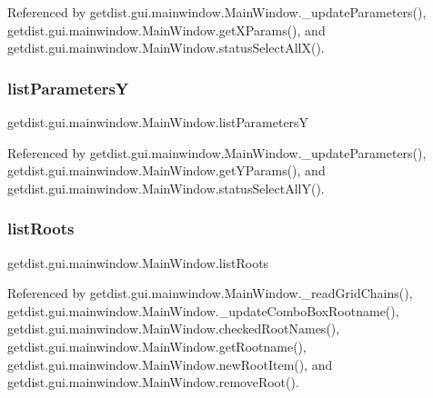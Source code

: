 Referenced by getdist.\+gui.\+mainwindow.\+Main\+Window.\+\_\+update\+Parameters(), getdist.\+gui.\+mainwindow.\+Main\+Window.\+get\+X\+Params(), and getdist.\+gui.\+mainwindow.\+Main\+Window.\+status\+Select\+All\+X().

\mbox{\label{classgetdist_1_1gui_1_1mainwindow_1_1MainWindow_acff0069bba3eaa164fc526de79bfe3a5}} 
\subsubsection{\texorpdfstring{list\+ParametersY}{listParametersY}}
{\footnotesize\ttfamily getdist.\+gui.\+mainwindow.\+Main\+Window.\+list\+ParametersY}



Referenced by getdist.\+gui.\+mainwindow.\+Main\+Window.\+\_\+update\+Parameters(), getdist.\+gui.\+mainwindow.\+Main\+Window.\+get\+Y\+Params(), and getdist.\+gui.\+mainwindow.\+Main\+Window.\+status\+Select\+All\+Y().

\mbox{\label{classgetdist_1_1gui_1_1mainwindow_1_1MainWindow_a18fc4f8efb9fb444611944dd75e5847e}} 
\subsubsection{\texorpdfstring{list\+Roots}{listRoots}}
{\footnotesize\ttfamily getdist.\+gui.\+mainwindow.\+Main\+Window.\+list\+Roots}



Referenced by getdist.\+gui.\+mainwindow.\+Main\+Window.\+\_\+read\+Grid\+Chains(), getdist.\+gui.\+mainwindow.\+Main\+Window.\+\_\+update\+Combo\+Box\+Rootname(), getdist.\+gui.\+mainwindow.\+Main\+Window.\+checked\+Root\+Names(), getdist.\+gui.\+mainwindow.\+Main\+Window.\+get\+Rootname(), getdist.\+gui.\+mainwindow.\+Main\+Window.\+new\+Root\+Item(), and getdist.\+gui.\+mainwindow.\+Main\+Window.\+remove\+Root().

